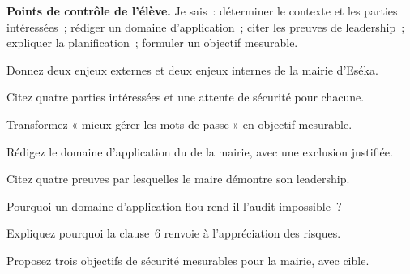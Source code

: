 \begin{boxinfo}
\textbf{Points de contrôle de l'élève.} Je sais~: déterminer le contexte et les
parties intéressées~; rédiger un domaine d'application~; citer les preuves de
leadership~; expliquer la planification~; formuler un objectif mesurable.
\end{boxinfo}

\bigskip

\begin{boxexo}[title={\ding{45}\quad Exercice~8.1. Contexte \niveaubase}]
Donnez deux enjeux externes et deux enjeux internes de la mairie d'Eséka.
\end{boxexo}

\begin{boxexo}[title={\ding{45}\quad Exercice~8.2. Parties intéressées \niveaubase}]
Citez quatre parties intéressées et une attente de sécurité pour chacune.
\end{boxexo}

\begin{boxexo}[title={\ding{45}\quad Exercice~8.3. Objectif mesurable \niveaubase}]
Transformez « mieux gérer les mots de passe » en objectif mesurable.
\end{boxexo}

\begin{boxexo}[title={\ding{45}\quad Exercice~8.4. Domaine d'application \niveaumoyen}]
Rédigez le domaine d'application du  de la mairie, avec une
exclusion justifiée.
\end{boxexo}

\begin{boxexo}[title={\ding{45}\quad Exercice~8.5. Preuves de leadership \niveaumoyen}]
Citez quatre preuves par lesquelles le maire démontre son leadership.
\end{boxexo}

\begin{boxexo}[title={\ding{45}\quad Exercice~8.6. Périmètre flou \niveaumoyen}]
Pourquoi un domaine d'application flou rend-il l'audit impossible~?
\end{boxexo}

\begin{boxexo}[title={\ding{45}\quad Exercice~8.7. Planifier par le risque \niveaumoyen}]
Expliquez pourquoi la clause~6 renvoie à l'appréciation des risques.
\end{boxexo}

\begin{boxexo}[title={\ding{45}\quad Exercice~8.8. Trois objectifs \niveaumoyen}]
Proposez trois objectifs de sécurité mesurables pour la mairie, avec cible.
\end{boxexo}

